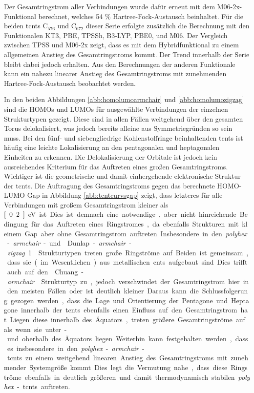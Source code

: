 Der Gesamtringstrom aller Verbindungen wurde dafür erneut mit dem M06-2x-Funktional\supercite{zhao2008m06} berechnet, welches 54 \% Hartree-Fock-Austausch beinhaltet. Für die beiden \acp{tcnt} C$_{576}$ und C$_{672}$ dieser Serie erfolgte zusätzlich die Berechnung mit den Funktionalen KT3,\supercite{keal2004semiempirical} PBE,\supercite{perdew1996generalized} TPSSh,\supercite{staroverov2003comparative} B3-LYP,\supercite{becke1993density,lee1988development,stephens1994ab} PBE0,\supercite{adamo1999toward} und M06.\supercite{zhao2008m06} Der Vergleich zwischen TPSS und M06-2x zeigt, dass es mit dem Hybridfunktional zu einem allgemeinen Anstieg des Gesamtringstroms kommt. Der Trend innerhalb der Serie bleibt dabei jedoch erhalten. Aus den Berechnungen der anderen Funktionale kann ein nahezu linearer Anstieg des Gesamtringstroms mit zunehmenden Hartree-Fock-Austausch beobachtet werden.

\bigskip
In den beiden Abbildungen \ref{abb:homolumoarmchair} und \ref{abb:homolumozigzag} sind die HOMOs und LUMOs für ausgewählte Verbindungen der einzelnen Strukturtypen gezeigt. Diese sind in allen Fällen weitgehend über den gesamten Torus delokalisiert, was jedoch bereits alleine aus Symmetriegründen so sein muss. Bei den fünf- und siebengliedrige Kohlenstoffringe beinhaltenden \acp{tcnt} ist häufig eine leichte Lokalisierung an den pentagonalen und heptagonalen Einheiten zu erkennen. Die Delokalisierung der Orbitale ist jedoch kein ausreichendes Kriterium für das Auftreten eines großen Gesamtringstroms. Wichtiger ist die geometrische und damit einhergehende elektronische Struktur der \acp{tcnt}. Die Auftragung des Gesamtringstroms gegen das berechnete HOMO-LUMO-Gap in Abbildung \ref{abb:tcntcurvsgap} zeigt, dass letzteres für alle Verbindungen mit großem Gesamtringstrom kleiner als \unit[0.2]{eV} ist. Dies ist demnach eine notwendige, aber nicht hinreichende Bedingung für das Auftreten eines Ringstromes, da ebenfalls Strukturen mit kleinem Gap aber ohne Gesamtringstrom auftreten. Insbesondere in den \textit{polyhex}-\textit{armchair}- und \glqq Dunlap-\textit{armchair}-\textit{zigzag} 1\grqq{} Strukturtypen treten große Ringströme auf. Beiden ist gemeinsam, dass sie (im Wesentlichen) aus metallischen \acp{cnt} aufgebaut sind. Dies trifft auch auf den \glqq Chuang-\textit{armchair}\grqq{} Strukturtyp zu, jedoch verschwindet der Gesamtringstrom hier in den meisten Fällen oder ist deutlich kleiner. Daraus kann die Schlussfolgerung gezogen werden, dass die Lage und Orientierung der Pentagone und Heptagone innerhalb der \acp{tcnt} ebenfalls einen Einfluss auf den Gesamtringstrom hat. Liegen diese innerhalb des Äquators, treten größere Gesamtringströme auf als wenn sie unter- und oberhalb des Äquators liegen. Weiterhin kann festgehalten werden, dass es insbesondere in den \textit{polyhex}-\textit{armchair}-\acp{tcnt} zu einem weitgehend linearen Anstieg des Gesamtringstroms mit zunehmender Systemgröße kommt. Dies legt die Vermutung nahe, dass diese Ringströme ebenfalls in deutlich größeren und damit thermodynamisch stabilen \textit{polyhex}-\acp{tcnt} auftreten.


